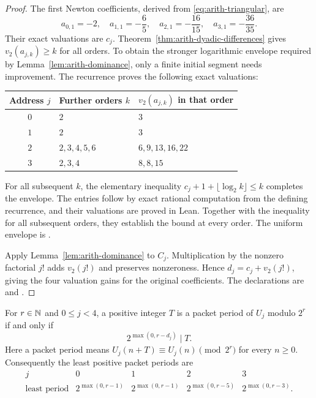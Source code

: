 \begin{proof}
The first Newton coefficients, derived from
\eqref{eq:arith-triangular}, are
\[
 a_{0,1}=-2,\quad a_{1,1}=-\frac65,\quad
 a_{2,1}=-\frac{16}{15},\quad a_{3,1}=-\frac{36}{35}.
\]
Their exact valuations are $c_j$.  Theorem~\ref{thm:arith-dyadic-differences}
gives $v_2(a_{j,k})\ge k$ for all orders.  To obtain the stronger
logarithmic envelope required by Lemma~\ref{lem:arith-dominance}, only
a finite initial segment needs improvement.  The recurrence proves the
following exact valuations:
\begin{center}
\begin{tabular}{cll}\toprule
Address $j$ & Further orders $k$ & $v_2(a_{j,k})$ in that order\\\midrule
$0$ & $2$ & $3$\\
$1$ & $2$ & $3$\\
$2$ & $2,3,4,5,6$ & $6,9,13,16,22$\\
$3$ & $2,3,4$ & $8,8,15$\\\bottomrule
\end{tabular}
\end{center}
For all subsequent $k$, the elementary inequality
$c_j+1+\lfloor\log_2k\rfloor\le k$ completes the envelope.
The entries follow by exact rational computation from the defining
recurrence, and their valuations are proved in Lean.  Together with the
inequality for all subsequent orders, they establish the bound at every
order.
The uniform envelope is
.

Apply Lemma~\ref{lem:arith-dominance} to $C_j$.  Multiplication by the
nonzero factorial $j!$ adds $v_2(j!)$ and preserves nonzeroness.
Hence $d_j=c_j+v_2(j!)$, giving the four valuation gains for the original
coefficients.
The declarations are
and .
\end{proof}

\begin{corollary}
\label{cor:arith-least-period}
For $r\in\mathbb N$ and $0\le j<4$, a positive integer $T$ is a packet period
of $U_j$ modulo $2^r$ if and only if
\[
 2^{\max(0,r-d_j)}\mid T.
\]
Here a packet period means $U_j(n+T)\equiv U_j(n)\pmod{2^r}$ for every
$n\ge0$.  Consequently the least positive packet periods are
\[
 \begin{array}{c|cccc}
 j&0&1&2&3\\\hline
 \text{least period}&2^{\max(0,r-1)}&2^{\max(0,r-1)}&
                 2^{\max(0,r-5)}&2^{\max(0,r-3)}.
 \end{array}
\]
\end{corollary}


